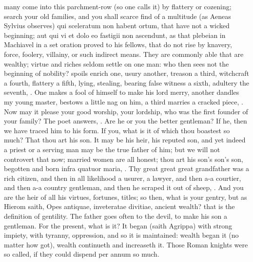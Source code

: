 {many come into this parchment-row (so one calls it) by flattery
or cozening; search your old families, and you shall scarce find of a
multitude (as Aeneas Sylvius observes) qui sceleratum non habent ortum,
that have not a wicked beginning; aut qui vi et dolo eo fastigii non
ascendunt, as that plebeian in Machiavel in a set oration proved
to his fellows, that do not rise by knavery, force, foolery, villainy,
or such indirect means. They are commonly able that are wealthy; virtue
and riches seldom settle on one man: who then sees not the beginning of
nobility? spoils enrich one, usury another, treason a third, witchcraft
a fourth, flattery a fifth, lying, stealing, bearing false witness a
sixth, adultery the seventh, \etc{}. One makes a fool of himself to make
his lord merry, another dandles my young master, bestows a little nag
on him, a third marries a cracked piece, \etc{}. Now may it please your
good worship, your lordship, who was the first founder of your family?
The poet answers, .
Are he or you the better gentleman? If he, then we have traced him to
his form. If you, what is it of which thou boastest so much? That thou
art his son. It may be his heir, his reputed son, and yet indeed a
priest or a serving man may be the true father of him; but we will not
controvert that now; married women are all honest; thou art his son's
son's son, begotten and born infra quatuor maria, \etc{}. Thy great great
great grandfather was a rich citizen, and then in all likelihood a
usurer, a lawyer, and then a-a courtier, and then a-a country
gentleman, and then he scraped it out of sheep, \etc{}. And you are the
heir of all his virtues, fortunes, titles; so then, what is your
gentry, but as Hierom saith, Opes antiquae, inveteratae divitiae,
ancient wealth? that is the definition of gentility. The father goes
often to the devil, to make his son a gentleman. For the present, what
is it? It began (saith Agrippa) with strong impiety, with
tyranny, oppression, \etc{} and so it is maintained: wealth began it (no
matter how got), wealth continueth and increaseth it. Those Roman
knights were so called, if they could dispend per annum so much.

}
